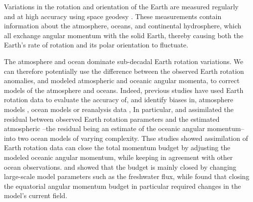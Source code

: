 
Variations in the rotation and orientation of the Earth are measured regularly and at high accuracy using space geodesy \citep{Gross1992,iers}. 
These measurements contain information about the atmosphere, oceans, and continental hydrosphere, which all exchange angular momentum with the solid Earth, thereby causing both the Earth's rate of rotation and its polar orientation to fluctuate. 

The atmosphere and ocean dominate sub-decadal Earth rotation variations. 
We can therefore potentially use the difference between the observed Earth rotation anomalies, and modeled atmospheric and oceanic angular momenta, to correct models of the atmosphere and oceans. 
Indeed, previous studies have used Earth rotation data to evaluate the accuracy of, 
and identify biases in, atmosphere models \citep{Boer1990, Rosen2000}, ocean 
models \citep{Gross1996a} or reanalysis data \citep{Yu1999, Aoyama2000, 
Paek2012a},
In particular, \citet{Saynisch2010,Saynisch2011} and \citet{Saynisch2012} assimilated the residual between observed Earth rotation parameters and the estimated atmospheric --the residual being an estimate of the oceanic angular momentum-- into two ocean models of varying complexity. 
Thse studies showed assimilation of Earth rotation data can close the total momentum budget by adjusting the modeled oceanic angular momentum, while keeping in agreement with other ocean observations.  
\citet{Saynisch2010} and \citet{Saynisch2012} showed that the budget is mainly closed by changing large-scale model parameters such as the freshwater flux, while \citet{Saynisch2011} found that closing the equatorial angular momentum budget in particular required changes in the model's current field. 


